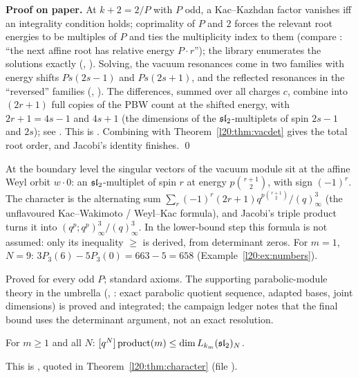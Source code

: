 \textbf{Proof on paper.} At $k+2=2/P$ with $P$ odd, a Kac--Kazhdan factor vanishes iff an integrality condition holds;
coprimality of $P$ and $2$ forces the relevant root energies to be multiples of $P$ and ties the multiplicity
index to them (compare : ``the next affine root has relative energy
$P\cdot r$''); the library enumerates the solutions exactly (, ). Solving, the vacuum
resonances come in two families with energy shifts $Ps(2s-1)$ and $Ps(2s+1)$, and the reflected resonances in the
``reversed'' families (, ). The differences, summed over all
charges $c$, combine into $(2r+1)$ full copies of the PBW count at the shifted energy, with
$2r+1=4s-1$ and $4s+1$ (the dimensions of the $\mathfrak{sl}_2$-multiplets of spin $2s-1$ and $2s$); see
. This is . Combining with
Theorem~\ref{l20:thm:vacdet} gives the total root order, and Jacobi's identity finishes. \qed

\begin{physics}
At the boundary level the singular vectors of the vacuum module sit at the affine Weyl orbit $w\cdot0$: an
$\mathfrak{sl}_2$-multiplet of spin $r$ at energy $p\binom{r+1}2$, with sign $(-1)^r$. The character is the alternating sum
$\sum_r(-1)^r(2r+1)q^{p\binom{r+1}2}/(q)^3_\infty$ (the unflavoured Kac--Wakimoto / Weyl--Kac formula), and Jacobi's
triple product turns it into $(q^p;q^p)^3_\infty/(q)^3_\infty$. In the lower-bound step this formula is not assumed: only its inequality
$\ge$ is derived, from determinant zeros. For $m=1$, $N=9$: $3P_3(6)-5P_3(0)=663-5=658$ (Example~\ref{l20:ex:numbers}).
\end{physics}

\begin{status}
Proved for every odd $P$; standard axioms. The supporting parabolic-module theory in the umbrella
(, : exact parabolic quotient
sequence, adapted bases, joint dimensions) is proved and integrated; the campaign ledger notes that the final
bound uses the determinant argument, not an exact resolution.
\end{status}

\begin{theorem}\label{l20:thm:lower}
For $m\ge1$ and all $N$: $[q^N]\,\mathrm{product}(m)\le\dim L_{k_m}(\mathfrak{sl}_2)_N$.
\end{theorem}
\noindent This is , quoted in Theorem~\ref{l20:thm:character}
(file ).

